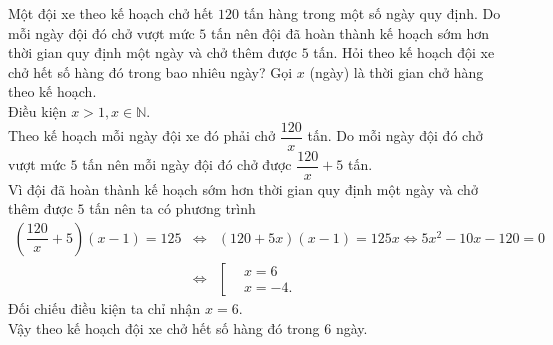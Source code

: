 \begin{ex}%
 Một đội xe theo kế hoạch chở hết $120$ tấn hàng trong một số ngày quy định. Do mỗi ngày đội đó chở vượt mức $5$ tấn nên đội đã hoàn thành kế hoạch sớm hơn thời gian quy định một ngày và chở thêm được $5$ tấn. Hỏi theo kế hoạch đội xe chở hết số hàng đó trong bao nhiêu ngày?
 \loigiai
  {
  Gọi $x$ (ngày) là thời gian chở hàng theo kế hoạch.\\
  Điều kiện $x>1, x\in\mathbb{N}$.\\
  Theo kế hoạch mỗi ngày đội xe đó phải chở $\dfrac{120}{x}$ tấn. Do mỗi ngày đội đó chở vượt mức $5$ tấn nên mỗi ngày đội đó chở được $\dfrac{120}{x} + 5$ tấn.\\
  Vì đội đã hoàn thành kế hoạch sớm hơn thời gian quy định một ngày và chở thêm được $5$ tấn nên ta có phương trình
  \begin{eqnarray*}
   \left(\dfrac{120}{x}+5\right)(x-1)=125 &\Leftrightarrow & (120+5x)(x-1)=125x \Leftrightarrow 5x^2-10x-120=0\\
   &\Leftrightarrow & \left[\begin{aligned} &x=6 \\& x=-4.\end{aligned}\right.
  \end{eqnarray*}
  Đối chiếu điều kiện ta chỉ nhận $x=6$.\\
  Vậy theo kế hoạch đội xe chở hết số hàng đó trong $6$ ngày.
  }
\end{ex}


